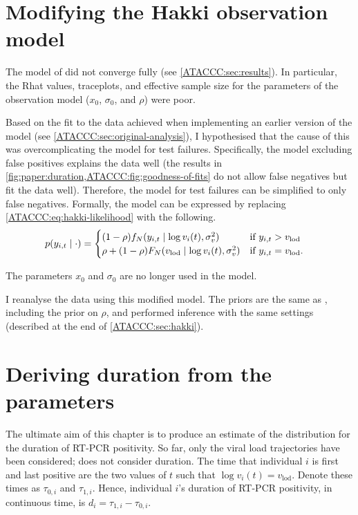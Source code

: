 \documentclass[thesis.tex]{subfiles}
\begin{document}
\section{Modifying the Hakki observation model} \label{ATACCC:sec:observation-modification}

The model of \textcite{hakkiOnset} did not converge fully (see \cref{ATACCC:sec:results}).
In particular, the Rhat values, traceplots, and effective sample size for the parameters of the observation model ($x_0$, $\sigma_0$, and $\rho$) were poor.

Based on the fit to the data achieved when implementing an earlier version of the model (see \cref{ATACCC:sec:original-analysis}), I hypothesised that the cause of this was overcomplicating the model for test failures.
Specifically, the model excluding false positives explains the data well (the results in \cref{fig:paper:duration,ATACCC:fig:goodness-of-fits} do not allow false negatives but fit the data well).
Therefore, the model for test failures can be simplified to only false negatives.
Formally, the model can be expressed by replacing \cref{ATACCC:eq:hakki-likelihood} with the following.
\begin{align}
p(y_{i,t} \mid \cdot) &= \begin{cases}
    (1 - \rho) f_N(y_{i,t} \mid \log v_i(t), \sigma_v^2) & \text{if $y_{i,t} > v_\text{lod}$}\\
    \rho + (1 - \rho) F_N(v_\text{lod} \mid \log v_i(t), \sigma_v^2) & \text{if $y_{i,t} = v_\text{lod}$.}
\end{cases}
\end{align}

The parameters $x_0$ and $\sigma_0$ are no longer used in the model.

I reanalyse the data using this modified model.
The priors are the same as \textcite{hakkiOnset}, including the prior on $\rho$, and performed inference with the same settings (described at the end of \cref{ATACCC:sec:hakki}).


\section{Deriving duration from the parameters} \label{ATACCC:sec:duration}

The ultimate aim of this chapter is to produce an estimate of the distribution for the duration of RT-PCR positivity.
So far, only the viral load trajectories have been considered; \textcite{hakkiOnset} does not consider duration.
The time that individual $i$ is first and last positive are the two values of $t$ such that $\log v_i(t) = v_\text{lod}$.
Denote these times as $\tau_{0,i}$ and $\tau_{1,i}$.
Hence, individual $i$'s duration of RT-PCR positivity, in continuous time, is $d_i = \tau_{1,i} - \tau_{0,i}$.
\end{document}
